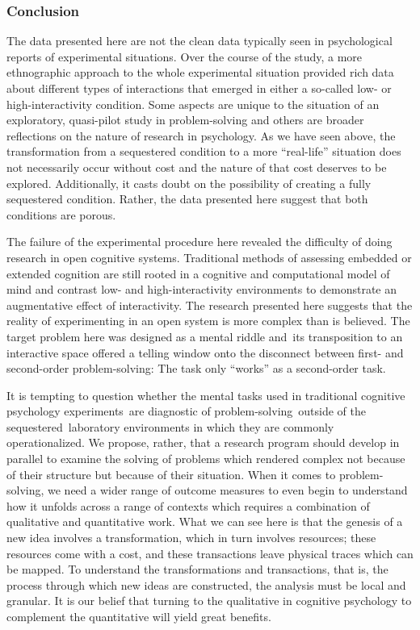 \documentclass[twocolumn, serif, empirical, authordate]{jote-article}
\begin{document}
{{
\subsubsection{Conclusion}

The data presented here are not the clean data typically seen in psychological reports of experimental situations. Over the course of the study, a more ethnographic approach to the whole experimental situation provided rich data about different types of interactions that emerged in either a so-called low- or high-interactivity condition. Some aspects are unique to the situation of an exploratory, quasi-pilot study in problem-solving and others are broader reflections on the nature of research in psychology. As we have seen above, the transformation from a sequestered condition to a more ``real-life'' situation does not necessarily occur without cost and the nature of that cost deserves to be explored. Additionally, it casts doubt on the possibility of creating a fully sequestered condition. Rather, the data presented here suggest that both conditions are porous.

The failure of the experimental procedure here revealed the difficulty of doing research in open cognitive systems. Traditional methods of assessing embedded or extended cognition are still rooted in a cognitive and computational model of mind and contrast low- and high-interactivity environments to demonstrate an augmentative effect of interactivity. The research presented here suggests that the reality of experimenting in an open system is more complex than is believed. The target problem here was designed as a mental riddle and~its transposition to an interactive space offered a telling window onto the disconnect between first- and second-order problem-solving: The task only ``works'' as a second-order task.

It is tempting to question whether the mental tasks used in traditional cognitive psychology experiments~are diagnostic of problem-solving~outside of the sequestered~laboratory environments in which they are commonly operationalized. We propose, rather, that a research program should develop in parallel to examine the solving of problems which rendered complex not because of their structure but because of their situation. When it comes to problem-solving, we need a wider range of outcome measures to even begin to understand how it unfolds across a range of contexts which requires a combination of qualitative and quantitative work. What we can see here is that the genesis of a new idea involves a transformation, which in turn involves resources; these resources come with a cost, and these transactions leave physical traces which can be mapped. To understand the transformations and transactions, that is, the process through which new ideas are constructed, the analysis must be local and granular. It is our belief that turning to the qualitative in cognitive psychology to complement the quantitative will yield great benefits.

}}
\end{document}
